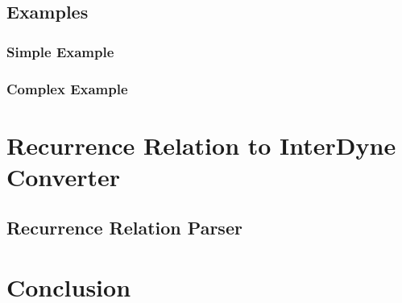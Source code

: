 \documentclass{article}
\begin{document}

\subsection{Examples}
\subsubsection{Simple Example}
\subsubsection{Complex Example}

\section{Recurrence Relation to InterDyne Converter} 





\subsection{Recurrence Relation Parser}










\section{Conclusion}
\end{document}
